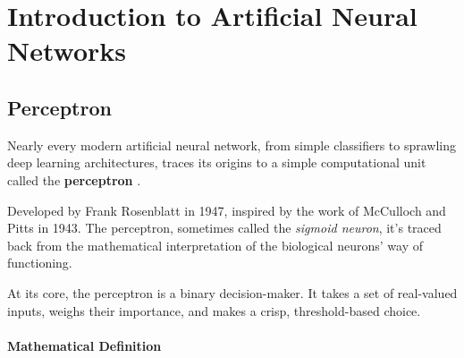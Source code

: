 \documentclass{tufte-handout}
\begin{document}
\begin{marginfigure}
\centering
{}
\caption{KL divergence $D_{\text{KL}}(p\parallel q)$ is zero when the distributions coincide.}
\end{marginfigure}


\section{Introduction to Artificial Neural Networks}

\subsection{Perceptron}

Nearly every modern artificial neural network, from simple classifiers to sprawling deep learning architectures, traces its origins to a simple computational unit called the \textbf{perceptron} .

Developed by Frank Rosenblatt in 1947, inspired by the work of McCulloch and Pitts in 1943. The perceptron, sometimes called the \textit{sigmoid neuron}, it's traced back from the mathematical interpretation of the biological neurons' way of functioning.

At its core, the perceptron is a binary decision-maker. It takes a set of real-valued inputs, weighs their importance, and makes a crisp, threshold-based choice.

\paragraph{Mathematical Definition}
\end{document}

